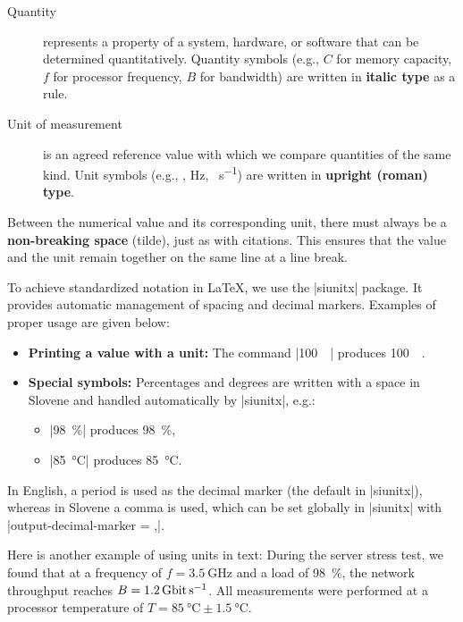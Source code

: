 \documentclass[9pt]{style/friteza}
\begin{document}
\begin{description}
    \item[Quantity] represents a property of a system, hardware, or software that can be determined quantitatively. Quantity symbols (e.g., $C$ for memory capacity, $f$ for processor frequency, $B$ for bandwidth) are written in \textbf{italic type} as a rule.
    \item[Unit of measurement] is an agreed reference value with which we compare quantities of the same kind. Unit symbols (e.g., \unit{\byte}, \unit{\hertz}, \unit{\bit\per\second}) are written in \textbf{upright (roman) type}.
\end{description}

Between the numerical value and its corresponding unit, there must always be a \textbf{non-breaking space} (tilde), just as with citations. This ensures that the value and the unit remain together on the same line at a line break.

To achieve standardized notation in \LaTeX{}, we use the \ltx|siunitx| package. It provides automatic management of spacing and decimal markers. Examples of proper usage are given below:

\begin{itemize}
    \item \textbf{Printing a value with a unit:} The command \ltx|\qty{100}{\giga\byte}| produces \qty{100}{\giga\byte}.
    \item \textbf{Special symbols:} Percentages and degrees are written with a space in Slovene and handled automatically by \ltx|siunitx|, e.g.:
    \begin{itemize}
         \item\ltx|\qty{98}{\percent}| produces \qty{98}{\percent},
         \item\ltx|\qty{85}{\degreeCelsius}| produces \qty{85}{\degreeCelsius}.
     \end{itemize}
\end{itemize}

In English, a period is used as the decimal marker (the default in \ltx|siunitx|), whereas in Slovene a comma is used, which can be set globally in \ltx|siunitx| with \ltx|output-decimal-marker = {,}|.

Here is another example of using units in text: During the server stress test, we found that at a frequency of $f = \qty{3.5}{\giga\hertz}$ and a load of \qty{98}{\percent}, the network throughput reaches $B = \qty{1.2}{\giga\bit\per\second}$. All measurements were performed at a processor temperature of $T = \qty{85}{\degreeCelsius} \pm \qty{1.5}{\degreeCelsius}$.
\end{document}
